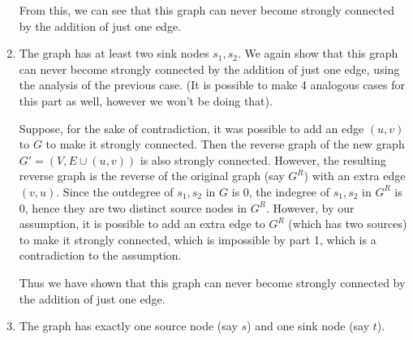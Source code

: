 \documentclass[answers]{exam}
\begin{document}
\begin{questions}
\begin{parts}
\begin{solution}
\begin{enumerate}
    From this, we can see that this graph can never become strongly connected by the addition of just one edge.
    
    \item The graph has at least two sink nodes $s_1, s_2$. We again show that this graph can never become strongly connected by the addition of just one edge, using the analysis of the previous case. (It is possible to make 4 analogous cases for this part as well, however we won't be doing that).
    
    Suppose, for the sake of contradiction, it was possible to add an edge $(u, v)$ to $G$ to make it strongly connected. Then the reverse graph of the new graph $G' = (V, E \cup (u, v))$ is also strongly connected. However, the resulting reverse graph is the reverse of the original graph (say $G^R$) with an extra edge $(v, u)$. Since the outdegree of $s_1, s_2$ in $G$ is $0$, the indegree of $s_1, s_2$ in $G^R$ is $0$, hence they are two distinct source nodes in $G^R$. However, by our assumption, it is possible to add an extra edge to $G^R$ (which has two sources) to make it strongly connected, which is impossible by part 1, which is a contradiction to the assumption.
    
    Thus we have shown that this graph can never become strongly connected by the addition of just one edge.
    
    \item The graph has exactly one source node (say $s$) and one sink node (say $t$).
    

\end{enumerate}
\end{solution}
\end{parts}
\end{questions}
\end{document}
